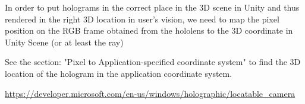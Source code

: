 \documentclass[a4paper,10pt]{article}
\begin{document}
In order to put holograms in the correct place in the 3D scene in Unity and thus rendered in the right 3D location in user's vision, we need to map the pixel position on the RGB frame obtained from the hololens to the 3D coordinate in Unity Scene (or at least the ray)

See the section: "Pixel to Application-specified coordinate system" to find the 3D location of the hologram in the application coordinate system.

\url{https://developer.microsoft.com/en-us/windows/holographic/locatable_camera}








\end{document}
